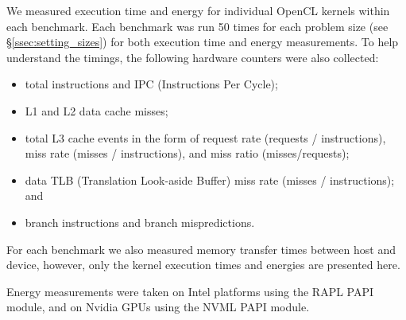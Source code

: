 \documentclass[../document.tex]{subfiles}
\begin{document}
\label{ssec:measurements}


We measured execution time and energy for individual OpenCL kernels within each benchmark.
Each benchmark was run 50 times for each problem size (see \S\ref{ssec:setting_sizes}) for both execution time and energy measurements.
To help understand the timings, the following hardware counters were also collected:
\begin{itemize}
	\item total instructions and IPC (Instructions Per Cycle);
	\item L1 and L2 data cache misses;
	\item total L3 cache events in the form of request rate (requests / instructions), miss rate (misses / instructions), and miss ratio (misses/requests);
	\item data TLB (Translation Look-aside Buffer) miss rate (misses / instructions); and
	\item branch instructions and branch mispredictions.
\end{itemize}
For each benchmark we also measured memory transfer times between host and device, however, only the kernel execution times and energies are presented here.

Energy measurements were taken on Intel platforms using the RAPL PAPI module, and on Nvidia GPUs using the NVML PAPI module.
\end{document}
